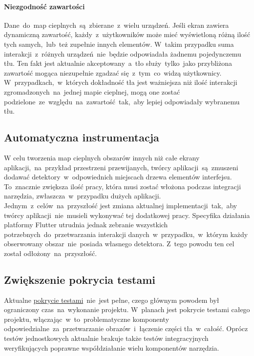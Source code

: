 \paragraph{Niezgodność zawartości}
Dane~do~map cieplnych~są~zbierane~z~wielu urządzeń. Jeśli ekran zawiera dynamiczną zawartość, każdy~z~użytkowników może mieć wyświetloną różną ilość tych samych,~lub~też zupełnie innych elementów. W~takim przypadku suma interakcji~z~różnych urządzeń~nie~będzie odpowiadała żadnemu pojedynczemu tłu. Ten fakt jest aktualnie akceptowany~a~tło służy~tylko~jako przybliżona zawartość mogąca niezupełnie zgadzać się~z~tym~co~widzą użytkownicy. W~przypadkach,~w~których dokładność tła jest ważniejsza niż ilość interakcji zgromadzonych~na~jednej mapie cieplnej, mogą one zostać podzielone~ze~względu~na~zawartość~tak,~aby lepiej odpowiadały wybranemu tłu.

\subsection{Automatyczna instrumentacja}
\label{sec:auto_instrumentation}
W celu tworzenia map cieplnych obszarów innych niż całe ekrany aplikacji,~na~przykład przestrzeni przewijanych, twórcy aplikacji~są~zmuszeni dodawać detektory~w~odpowiednich miejscach drzewa elementów interfejsu. To~znacznie zwiększa ilość pracy, która musi zostać włożona podczas integracji narzędzia, zwłaszcza~w~przypadku dużych aplikacji. Jednym~z~celów~na~przyszłość jest zmiana aktualnej implementacji~tak,~aby twórcy aplikacji~nie~musieli wykonywać tej dodatkowej pracy. Specyfika działania platformy Flutter utrudnia jednak zebranie wszystkich potrzebnych~do~przetwarzania interakcji danych~w~przypadku,~w~którym każdy obserwowany obszar~nie~posiada własnego detektora. Z~tego powodu ten cel został odłożony~na~przyszłość.

\subsection{Zwiększenie pokrycia testami}
\label{sec:future_coverage}
Aktualne \hyperref[par:test_coverage]{pokrycie testami}~nie~jest pełne, czego głównym powodem był ograniczony czas~na~wykonanie projektu. W~planach jest pokrycie testami całego projektu, włączając~w~to~problematyczne komponenty odpowiedzialne~za~przetwarzanie obrazów~i~łączenie części tła~w~całość. Oprócz testów jednostkowych aktualnie brakuje także testów integracyjnych weryfikujących poprawne współdziałanie wielu komponentów narzędzia.


